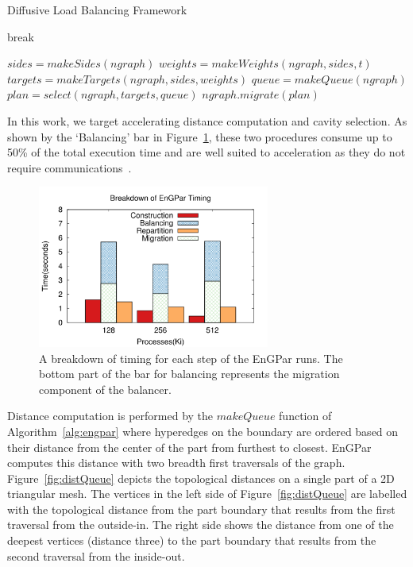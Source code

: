 \documentclass[graybox]{svmult}
\begin{document}
\begin{algorithm}[H]
  \caption{Diffusive Load Balancing Framework}
  \label{alg:engpar}
  \small
  \begin{algorithmic}[1]
    \State break
    \EndIf
    \EndWhile
    \EndFor
    \EndProcedure

    \State $sides = makeSides(ngraph)$
    \State $weights = makeWeights(ngraph,sides,t)$
    \State $targets = makeTargets(ngraph,sides,weights)$
    \State $queue = makeQueue(ngraph)$
    \State $plan = select(ngraph,targets,queue)$
    \State $ngraph.migrate(plan)$
    \EndProcedure
  \end{algorithmic}
\end{algorithm}

In this work, we target accelerating distance computation and cavity selection.
As shown by the `Balancing' bar in Figure~\ref{fig:partsgraph}, these two
procedures consume up to 50\% of the total execution time and are well suited to
acceleration as they do not require communications~\cite{engparSC17}.

\begin{figure}
  \centering
  \includegraphics[width=3in]{images/timeparts_v_cores.png}
  \caption{A breakdown of timing for each step of the EnGPar runs. The
    bottom part of the bar for balancing represents the migration
    component of the balancer.~\cite{engparSC17}}
  \label{fig:partsgraph}
\end{figure}

Distance computation is performed by the $makeQueue$ function of
Algorithm~\ref{alg:engpar} where hyperedges on the boundary are ordered based on
their distance from the center of the part from furthest to closest.
EnGPar computes this distance with two breadth first traversals of the graph.
Figure~\ref{fig:distQueue} depicts the topological distances on a single part of
a 2D triangular mesh.
The vertices in the left side of Figure~\ref{fig:distQueue} are labelled with
the topological distance from the part boundary that results from the first
traversal from the outside-in.
The right side shows the distance from one of the deepest vertices (distance
three) to the part boundary that results from the second traversal from the
inside-out.
\end{document}
